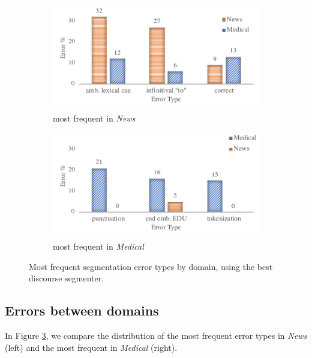 \begin{figure}
\centering
\begin{subfigure}{.5\textwidth}
  \centering
  \includegraphics[width=1\linewidth]{plots/anno_errors_news.pdf}
  \vspace{-2.2em}
  \caption{most frequent in \textit{News}}
  \label{fig:errors_news}
\end{subfigure}%
\begin{subfigure}{.5\textwidth}
  \centering
  \includegraphics[width=1\linewidth]{plots/anno_errors_medical.pdf}
  \vspace{-2.2em}
  \caption{most frequent in \textit{Medical}}
  \label{fig:errors_medical}
\end{subfigure}
\caption{Most frequent segmentation error types by domain, using the best discourse segmenter.}
\label{fig:errors}
\end{figure}

\subsection{Errors between domains}

In Figure \ref{fig:errors}, we compare the distribution of the most frequent error types in \textit{News} (left) and the most frequent in \textit{Medical} (right). 

